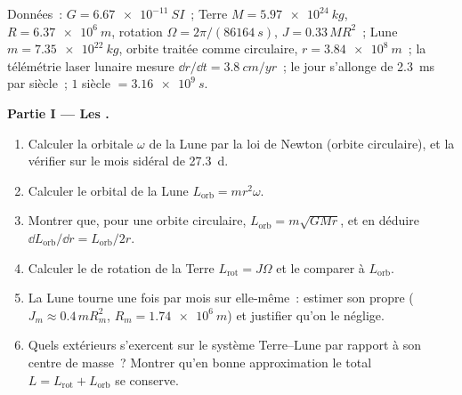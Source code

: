 \begin{problem}
\label{pb:b1:angular-momentum:1}
Données~: $G = \qty{6.67e-11}{SI}$~; Terre $M = \qty{5.97e24}{kg}$, $R =
\qty{6.37e6}{m}$, rotation $\Omega = 2\pi/(\qty{86164}{s})$,  $J = 0.33\,MR^2$~; Lune $m = \qty{7.35e22}{kg}$, orbite traitée
comme circulaire, $r = \qty{3.84e8}{m}$~; la télémétrie laser lunaire
mesure $\dd r/\dd t = \qty{3.8}{cm/yr}$~; le jour s'allonge de
\qty{2.3}{ms} par siècle~; $1$ siècle $= \qty{3.16e9}{s}$.

\medskip
\noindent\textbf{Partie I --- Les .}
\begin{enumerate}
  \item Calculer la  orbitale $\omega$ de la Lune par la
        loi de Newton (orbite circulaire), et la vérifier sur le mois
        sidéral de \qty{27.3}{d}.
  \item Calculer le  orbital de la Lune $L_{\text{orb}} =
        mr^2\omega$.
  \item Montrer que, pour une orbite circulaire, $L_{\text{orb}} = m\sqrt{GMr}$,
        et en déduire $\dd L_{\text{orb}}/\dd r = L_{\text{orb}}/2r$.
  \item Calculer le  de rotation de la Terre $L_{\text{rot}} =
        J\Omega$ et le comparer à $L_{\text{orb}}$.
  \item La Lune tourne une fois par mois sur elle-même~: estimer son
         propre ($J_m \approx 0.4\,mR_m^2$, $R_m = \qty{1.74e6}{m}$)
        et justifier qu'on le néglige.
  \item Quels  extérieurs s'exercent sur le système Terre--Lune
        par rapport à son centre de masse~? Montrer qu'en bonne
        approximation le total $L = L_{\text{rot}} + L_{\text{orb}}$ se conserve.
\end{enumerate}


\end{problem}
